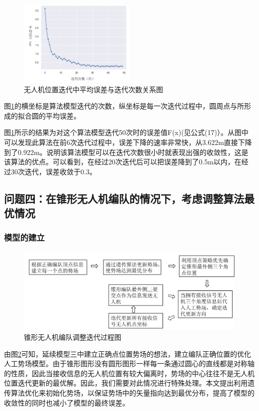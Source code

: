 \documentclass{my_paper}
\begin{document}
\begin{figure}[h]
    \centering
    \includegraphics[width=0.5\textwidth]{images/wucha.jpg}
    \caption{无人机位置迭代中平均误差与迭代次数关系图}
    \label{wucha}
\end{figure}
图\ref{wucha}的横坐标是算法模型迭代的次数，纵坐标是每一次迭代过程中，圆周点与所形成的拟合圆的平均误差。


图\ref{wucha}所示的结果为对这个算法模型迭代50次时的误差值F(x)(见公式(17)）。从图中可以发现此算法在前6次迭代过程中，误差下降的速率非常快，从3.622m直接下降到了0.922m。说明该算法模型可以在迭代次数很小时就表现出强的收敛性，这是该算法的优点。可以看到，在经过20次迭代后可以把误差降到了0.5m以内，在经过30次迭代，误差收敛于0.3。


\subsection{问题四：在锥形无人机编队的情况下，考虑调整算法最优情况}

\subsubsection{模型的建立}

\begin{figure}[h]
    \centering
    \includegraphics[width=1\textwidth]{images/wentisi.jpg}
    \caption{锥形无人机编队调整迭代过程图}
    \label{wentisi}
\end{figure}

由图\ref{wentisi}可知，延续模型三中建立正确点位置势场的想法，建立编队正确位置的优化人工势场模型。由于锥形图形没有圆形图形一样每一条通过圆心的直线都是对称轴的性质，因此当接收信息的无人机位置有较大偏离时，势场的中心往往不是无人机位置迭代更新的最优解。因此，我们需要对此情况进行特殊处理。本文提出利用遗传算法优化来初始化势场，以保证势场中的矢量指向达到最优分布，提高了模型的收敛性的同时也减小了模型的最终误差。
\end{document}
